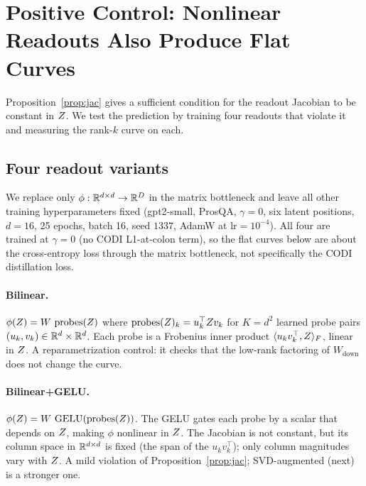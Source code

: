 \section{Positive Control: Nonlinear Readouts Also Produce Flat Curves}
\label{sec:pc}

Proposition~\ref{prop:jac} gives a sufficient condition for the
readout Jacobian to be constant in $Z$. We test the prediction by
training four readouts that violate it and measuring the rank-$k$
curve on each.

\subsection{Four readout variants}

We replace only $\phi:\mathbb{R}^{d\times d}\to\mathbb{R}^D$ in the matrix bottleneck
and leave all other training hyperparameters fixed (gpt2-small,
ProsQA, $\gamma=0$, six latent positions, $d=16$, 25 epochs, batch
16, seed $1337$, AdamW at $\text{lr}=10^{-4}$). All four are trained
at $\gamma=0$ (no CODI L1-at-colon term), so the flat curves below
are about the cross-entropy loss through the matrix bottleneck, not
specifically the CODI distillation loss.

\paragraph{Bilinear.} $\phi(Z) = W\,\operatorname{probes}(Z)$
where $\operatorname{probes}(Z)_k = u_k^\top Z v_k$ for $K=d^2$
learned probe pairs $(u_k,v_k)\in\mathbb{R}^d\times\mathbb{R}^d$. Each probe is a
Frobenius inner product $\langle u_k v_k^\top,Z\rangle_F$, linear
in $Z$. A reparametrization control: it checks that the low-rank
factoring of $W_{\text{down}}$ does not change the curve.

\paragraph{Bilinear+GELU.} $\phi(Z) = W\,\operatorname{GELU}(
\operatorname{probes}(Z))$. The GELU gates each probe by a scalar
that depends on $Z$, making $\phi$ nonlinear in $Z$. The Jacobian
is not constant, but its column space in $\mathbb{R}^{d\times d}$ is fixed
(the span of the $u_k v_k^\top$); only column magnitudes vary with
$Z$. A mild violation of Proposition~\ref{prop:jac}; SVD-augmented
(next) is a stronger one.


